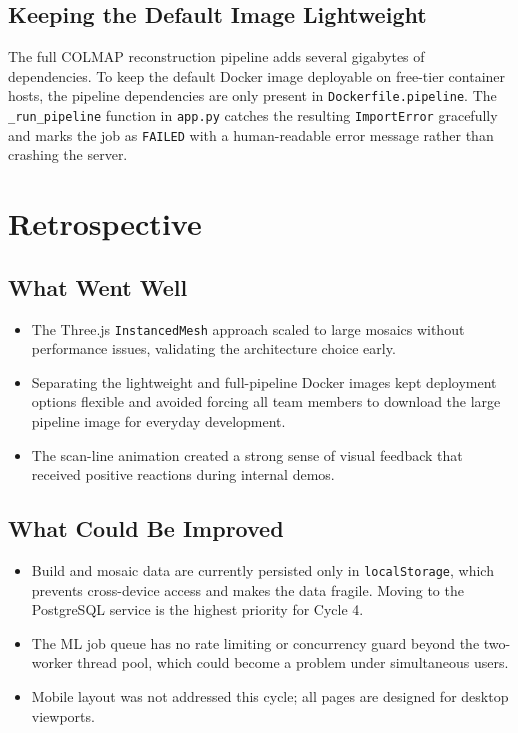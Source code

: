 \documentclass[12pt]{article}
\begin{document}
\subsection{Keeping the Default Image Lightweight}

The full COLMAP reconstruction pipeline adds several gigabytes of dependencies.
To keep the default Docker image deployable on free-tier container hosts, the
pipeline dependencies are only present in \texttt{Dockerfile.pipeline}. The
\texttt{\_run\_pipeline} function in \texttt{app.py} catches the resulting
\texttt{ImportError} gracefully and marks the job as \texttt{FAILED} with a
human-readable error message rather than crashing the server.

\section{Retrospective}

\subsection{What Went Well}

\begin{itemize}[leftmargin=*]
    \item The Three.js \texttt{InstancedMesh} approach scaled to large mosaics
          without performance issues, validating the architecture choice early.
    \item Separating the lightweight and full-pipeline Docker images kept
          deployment options flexible and avoided forcing all team members to
          download the large pipeline image for everyday development.
    \item The scan-line animation created a strong sense of visual feedback
          that received positive reactions during internal demos.
\end{itemize}

\subsection{What Could Be Improved}

\begin{itemize}[leftmargin=*]
    \item Build and mosaic data are currently persisted only in
          \texttt{localStorage}, which prevents cross-device access and makes
          the data fragile. Moving to the PostgreSQL service is the highest
          priority for Cycle 4.
    \item The ML job queue has no rate limiting or concurrency guard beyond
          the two-worker thread pool, which could become a problem under
          simultaneous users.
    \item Mobile layout was not addressed this cycle; all pages are designed
          for desktop viewports.
\end{itemize}
\end{document}
